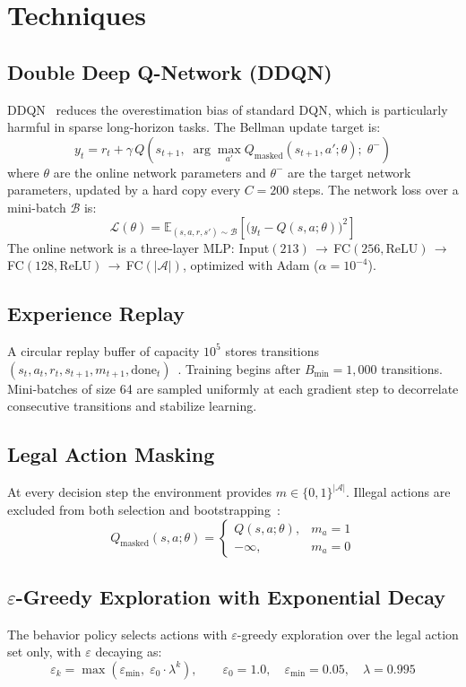 \documentclass[11pt]{article}
\begin{document}
\section{Techniques}

\subsection{Double Deep Q-Network (DDQN)}
DDQN~\cite{vanhasselt2016} reduces the overestimation bias of standard DQN, which is
particularly harmful in sparse long-horizon tasks. The Bellman update target is:
\[
  y_t = r_t + \gamma\,Q\!\left(s_{t+1},\;
        \arg\max_{a'}Q_{\text{masked}}(s_{t+1},a';\theta);\;\theta^{-}\right)
\]
where $\theta$ are the online network parameters and $\theta^{-}$ are the target network
parameters, updated by a hard copy every $C=200$ steps. The network loss over a mini-batch
$\mathcal{B}$ is:
\[
  \mathcal{L}(\theta)=
  \mathbb{E}_{(s,a,r,s')\sim\mathcal{B}}\!\left[\bigl(y_t-Q(s,a;\theta)\bigr)^2\right]
\]
The online network is a three-layer MLP:
Input$(213)$\,$\to$\,FC$(256,\text{ReLU})$\,$\to$\,FC$(128,\text{ReLU})$\,$\to$\,FC$(|\mathcal{A}|)$,
optimized with Adam ($\alpha=10^{-4}$).

\subsection{Experience Replay}
A circular replay buffer of capacity $10^5$ stores transitions
$(s_t,a_t,r_t,s_{t+1},m_{t+1},\text{done}_t)$~\cite{mnih2015}. Training begins
after $B_{\min}=1{,}000$ transitions. Mini-batches of size 64 are sampled uniformly
at each gradient step to decorrelate consecutive transitions and stabilize learning.

\subsection{Legal Action Masking}
At every decision step the environment provides $m\in\{0,1\}^{|\mathcal{A}|}$.
Illegal actions are excluded from both selection and bootstrapping~\cite{Huang2022}:
\[
  Q_{\text{masked}}(s,a;\theta)=
  \begin{cases}
    Q(s,a;\theta), & m_a=1 \\
    -\infty,       & m_a=0
  \end{cases}
\]

\subsection{$\varepsilon$-Greedy Exploration with Exponential Decay}
The behavior policy selects actions with $\varepsilon$-greedy exploration over the legal
action set only, with $\varepsilon$ decaying as:
\[
  \varepsilon_k = \max\!\left(\varepsilon_{\min},\;\varepsilon_0\cdot\lambda^k\right),
  \qquad \varepsilon_0=1.0,\quad\varepsilon_{\min}=0.05,\quad\lambda=0.995
\]
\end{document}
